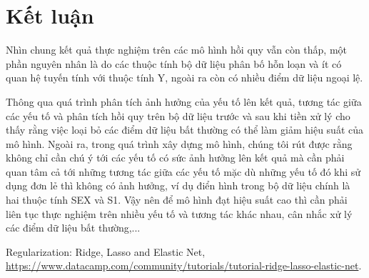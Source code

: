 \documentclass[runningheads]{llncs}
\begin{document}
\section{Kết luận}
Nhìn chung kết quả thực nghiệm trên các mô hình hồi quy vẫn còn thấp, một phần nguyên nhân là do các thuộc tính bộ dữ liệu phân bố hỗn loạn và ít có quan hệ tuyến tính với thuộc tính Y, ngoài ra còn có nhiều điểm dữ liệu ngoại lệ.

Thông qua quá trình phân tích ảnh hưởng của yếu tố lên kết quả, tương tác giữa các yếu tố và phân tích hồi quy trên bộ dữ liệu trước và sau khi tiền xử lý cho thấy rằng việc loại bỏ các điểm dữ liệu bất thường có thể làm giảm hiệu suất của mô hình. Ngoài ra, trong quá trình xây dựng mô hình, chúng tôi rút được rằng  không chỉ cần chú ý tới các yếu tố có sức ảnh hưởng lên kết quả mà cần phải quan tâm cả tới những tương tác giữa các yếu tố mặc dù những yếu tố đó khi sử dụng đơn lẻ thì không có ảnh hưởng, ví dụ điển hình trong bộ dữ liệu chính là hai thuộc tính SEX và S1. Vậy nên để mô hình đạt hiệu suất cao thì cần phải liên tục thực nghiệm trên nhiều yếu tố và tương tác khác nhau, cân nhắc xử lý các điểm dữ liệu bất thường,...

\begin{thebibliography}{5}
Regularization: Ridge, Lasso and Elastic Net, \url{https://www.datacamp.com/community/tutorials/tutorial-ridge-lasso-elastic-net}.
\end{thebibliography}
\end{document}
